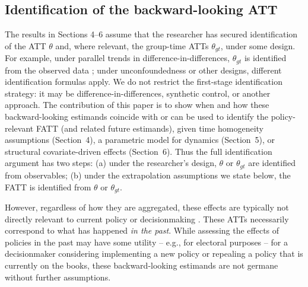 \documentclass{article}
\renewcommand{\P}{\mathbb{P}}
\begin{document}
\subsection{Identification of the backward-looking ATT}
The results in Sections 4--6 assume that the researcher has secured identification of the ATT $\theta$ and, where relevant, the group-time ATTs $\theta_{gt}$, under some design. For example, under parallel trends in difference-in-differences, $\theta_{gt}$ is identified from the observed data \citep{callawayDifferenceindifferencesMultipleTime2021,sunEstimatingDynamicTreatment2021}; under unconfoundedness or other designs, different identification formulas apply. We do not restrict the first-stage identification strategy: it may be difference-in-differences, synthetic control, or another approach. The contribution of this paper is to show when and how these backward-looking estimands coincide with or can be used to identify the policy-relevant FATT (and related future estimands), given time homogeneity assumptions (Section~4), a parametric model for dynamics (Section~5), or structural covariate-driven effects (Section~6). Thus the full identification argument has two steps: (a) under the researcher's design, $\theta$ or $\theta_{gt}$ are identified from observables; (b) under the extrapolation assumptions we state below, the FATT is identified from $\theta$ or $\theta_{gt}$.

However, regardless of how they are aggregated, these effects are typically not directly relevant to current policy or decisionmaking \citep{egamiElementsExternalValidity2023,khosrowiExtrapolationCausalEffects2019}. These ATTs necessarily correspond to what has happened \textit{in the past}. While assessing the effects of policies in the past may have some utility -- e.g., for electoral purposes -- for a decisionmaker considering implementing a new policy or repealing a policy that is currently on the books, these backward-looking estimands are not germane without further assumptions. 

\end{document}
